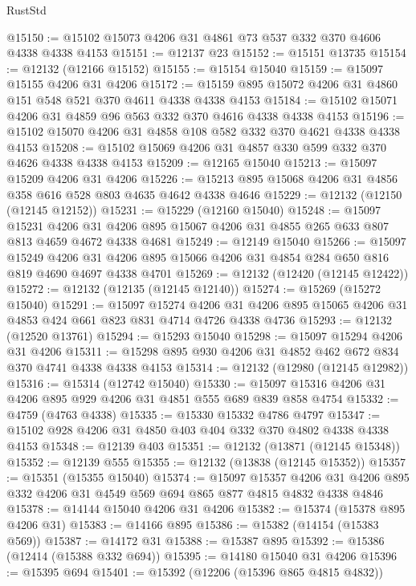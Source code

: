 \begin{lexlean}{RustStd}
\begin{coremodule}
{\begin{coremodule}
{{{{{{{{{{{{{{{{{{{{{{{{{{{{{{{{{{{{{{{{{{{{{{{{{{@15150 := @15102 @15073 @4206 @31 @4861 @73 @537 @332 @370 @4606 @4338 @4338 @4153
@15151 := @12137 @23
@15152 := @15151 @13735
@15154 := @12132 (@12166 @15152)
@15155 := @15154 @15040
@15159 := @15097 @15155 @4206 @31 @4206
@15172 := @15159 @895 @15072 @4206 @31 @4860 @151 @548 @521 @370 @4611 @4338 @4338 @4153
@15184 := @15102 @15071 @4206 @31 @4859 @96 @563 @332 @370 @4616 @4338 @4338 @4153
@15196 := @15102 @15070 @4206 @31 @4858 @108 @582 @332 @370 @4621 @4338 @4338 @4153
@15208 := @15102 @15069 @4206 @31 @4857 @330 @599 @332 @370 @4626 @4338 @4338 @4153
@15209 := @12165 @15040
@15213 := @15097 @15209 @4206 @31 @4206
@15226 := @15213 @895 @15068 @4206 @31 @4856 @358 @616 @528 @803 @4635 @4642 @4338 @4646
@15229 := @12132 (@12150 (@12145 @12152))
@15231 := @15229 (@12160 @15040)
@15248 := @15097
    @15231
    @4206
    @31
    @4206
    @895
    @15067
    @4206
    @31
    @4855
    @265
    @633
    @807
    @813
    @4659
    @4672
    @4338
    @4681
@15249 := @12149 @15040
@15266 := @15097
    @15249
    @4206
    @31
    @4206
    @895
    @15066
    @4206
    @31
    @4854
    @284
    @650
    @816
    @819
    @4690
    @4697
    @4338
    @4701
@15269 := @12132 (@12420 (@12145 @12422))
@15272 := @12132 (@12135 (@12145 @12140))
@15274 := @15269 (@15272 @15040)
@15291 := @15097
    @15274
    @4206
    @31
    @4206
    @895
    @15065
    @4206
    @31
    @4853
    @424
    @661
    @823
    @831
    @4714
    @4726
    @4338
    @4736
@15293 := @12132 (@12520 @13761)
@15294 := @15293 @15040
@15298 := @15097 @15294 @4206 @31 @4206
@15311 := @15298 @895 @930 @4206 @31 @4852 @462 @672 @834 @370 @4741 @4338 @4338 @4153
@15314 := @12132 (@12980 (@12145 @12982))
@15316 := @15314 (@12742 @15040)
@15330 := @15097 @15316 @4206 @31 @4206 @895 @929 @4206 @31 @4851 @555 @689 @839 @858 @4754
@15332 := @4759 (@4763 @4338)
@15335 := @15330 @15332 @4786 @4797
@15347 := @15102 @928 @4206 @31 @4850 @403 @404 @332 @370 @4802 @4338 @4338 @4153
@15348 := @12139 @403
@15351 := @12132 (@13871 (@12145 @15348))
@15352 := @12139 @555
@15355 := @12132 (@13838 (@12145 @15352))
@15357 := @15351 (@15355 @15040)
@15374 := @15097
    @15357
    @4206
    @31
    @4206
    @895
    @332
    @4206
    @31
    @4549
    @569
    @694
    @865
    @877
    @4815
    @4832
    @4338
    @4846
@15378 := @14144 @15040 @4206 @31 @4206
@15382 := @15374 (@15378 @895 @4206 @31)
@15383 := @14166 @895
@15386 := @15382 (@14154 (@15383 @569))
@15387 := @14172 @31
@15388 := @15387 @895
@15392 := @15386 (@12414 (@15388 @332 @694))
@15395 := @14180 @15040 @31 @4206
@15396 := @15395 @694
@15401 := @15392 (@12206 (@15396 @865 @4815 @4832))
}}}}}}}}}}}}}}}}}}}}}}}}}}}}}}}}}}}}}}}}}}}}}}}}}}
\end{coremodule}}
\end{coremodule}
\end{lexlean}
